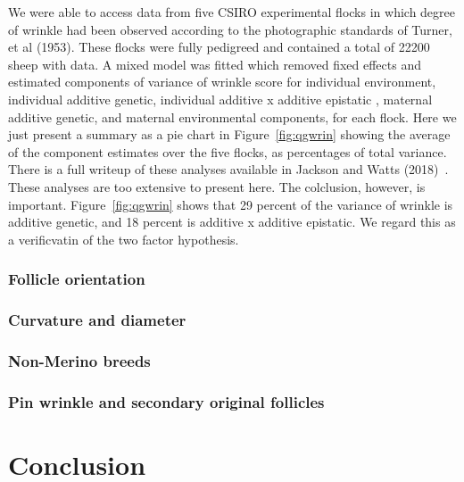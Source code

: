 \documentclass[titlepage]{article}  %
\begin{document}
We were able to access data from five CSIRO experimental flocks in which degree of wrinkle had been observed according to the photographic standards of Turner, et al (1953). These flocks were fully pedigreed and contained a total of 22200 sheep with data. A mixed model was fitted which removed fixed effects and estimated components of variance of wrinkle score  for individual environment, individual additive genetic, individual additive x additive epistatic , maternal additive genetic, and maternal environmental components, for each flock.  Here we just present a summary as a pie chart in Figure~\ref{fig:qgwrin} showing the average of the component estimates over the five flocks, as percentages of total variance. 
%
There is a full writeup of these analyses available in Jackson and Watts (2018)~\cite{jack:18}. These analyses are too extensive to present here. The colclusion, however, is important. Figure~\ref{fig:qgwrin} shows that 29 percent of the variance of wrinkle is additive genetic, and 18 percent is additive x additive epistatic. We regard this as a verificvatin of the two factor hypothesis.


\subsubsection{Follicle orientation}

\subsubsection{Curvature and diameter}

\subsubsection{Non-Merino breeds}

\subsubsection{Pin wrinkle and secondary original follicles}


\section{Conclusion}





\clearpage
\end{document}
